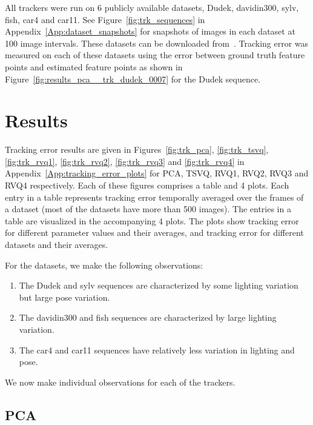 All trackers were run on 6 publicly available datasets, Dudek, davidin300, sylv, fish, car4 and car11.  See Figure~\ref{fig:trk_sequences} in Appendix~\ref{App:dataset_snapshots} for snapshots of images in each dataset at 100 image intervals.  These datasets can be downloaded from~\cite{2008_JNL_subspaceTRK_Ross}.  Tracking error was measured on each of these datasets using the error between ground truth feature points and estimated feature points as shown in Figure~\ref{fig:results_pca__trk_dudek_0007} for the Dudek sequence.



\section{Results}
Tracking error results are given in Figures~\ref{fig:trk_pca}, \ref{fig:trk_tsvq}, \ref{fig:trk_rvq1}, \ref{fig:trk_rvq2}, \ref{fig:trk_rvq3} and \ref{fig:trk_rvq4} in Appendix~\ref{App:tracking_error_plots} for PCA, TSVQ, RVQ1, RVQ2, RVQ3 and RVQ4 respectively.  Each of these figures comprises a table and 4 plots.  Each entry in a table represents tracking error temporally averaged over the frames of a dataset (most of the datasets have more than 500 images).  The entries in a table are visualized in the accompanying 4 plots.  The plots show tracking error for different parameter values and their averages, and tracking error for different datasets and their averages.  

For the datasets, we make the following observations:

\begin{enumerate}
\item The Dudek and sylv sequences are characterized by some lighting variation but large pose variation.
\item The davidin300 and fish sequences are characterized by large lighting variation.
\item The car4 and car11 sequences have relatively less variation in lighting and pose.
\end{enumerate}

We now make individual observations for each of the trackers.

\subsection{PCA}


